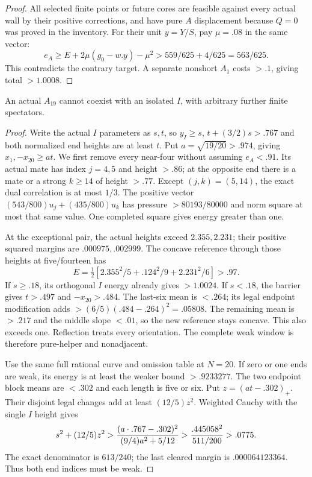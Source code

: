 \begin{proof}
All selected finite points or future cores are feasible against
every actual wall by their positive corrections, and have pure
$A$ displacement because $Q=0$ was proved in the inventory.
For their unit $y=Y/S$, pay $\mu=.08$ in the same vector:
\[
 e_A\ge E+2\mu(g_0-w.y)-\mu^2
 >559/625+4/625=563/625.
\]
This contradicts the contrary target. A separate nonshort $A_1$
costs $>.1$, giving total $>1.0008$.
\end{proof}

\begin{lemma}
\label{app:tail:lem:A19I}
An actual $A_{19}$ cannot coexist with an isolated $I$, with
arbitrary further finite spectators.
\end{lemma}
\begin{proof}
Write the actual $I$ parameters as $s,t$, so $y_I\ge s$,
$t+(3/2)s>.767$ and both normalized end heights are at least $t$.
Put $a=\sqrt{19/20}>.974$, giving $x_1,-x_{20}\ge at$.
We first remove every near-four without assuming $e_A<.91$.
Its actual mate has index $j=4,5$ and height $>.86$; at the
opposite end there is a mate or a strong $k\ge14$ of height $>.77$.
Except $(j,k)=(5,14)$, the exact dual correlation is at most $1/3$.
The positive vector $(543/800)u_j+(435/800)u_k$ has pressure
$>80193/80000$ and norm square at most that same value.
One completed square gives energy greater than one.

At the exceptional pair, the actual heights exceed $2.355,2.231$;
their positive squared margins are $.000975,.002999$.
The concave reference through those heights at five/fourteen has
\[
 E=\tfrac12[2.355^2/5+.124^2/9+2.231^2/6]>.97.
\]
If $s\ge.18$, its orthogonal $I$ energy already gives $>1.0024$.
If $s<.18$, the barrier gives $t>.497$ and $-x_{20}>.484$.
The last-six mean is $<.264$; its legal endpoint modification adds
$>(6/5)(.484-.264)^2=.05808$. The remaining mean is $>.217$
and the middle slope $<.01$, so the new reference stays concave.
This also exceeds one. Reflection treats every orientation. The
complete weak window is therefore pure-helper and nonadjacent.

Use the same full rational curve and omission table at $N=20$.
If zero or one ends are weak, its energy is at least the weaker
bound $>.9233277$. The two endpoint block means are $<.302$ and
each length is five or six. Put $z=(at-.302)_+$.
Their disjoint legal changes add at least $(12/5)z^2$.
Weighted Cauchy with the single $I$ height gives
\[
 s^2+(12/5)z^2>
 {(a\cdot.767-.302)^2\over(9/4)a^2+5/12}
 >{.445058^2\over511/200}>.0775.
\]
The exact denominator is $613/240$; the last cleared margin is
$.000064123364$. Thus both end indices must be weak.


\end{proof}
